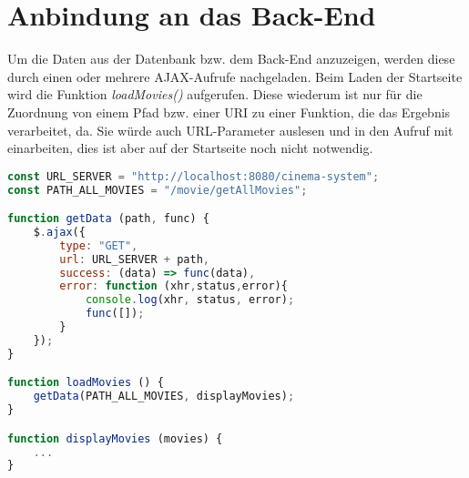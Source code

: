 \section{Anbindung an das Back-End}
\label{sec:anbindung_backend}

Um die Daten aus der Datenbank bzw. dem Back-End anzuzeigen, werden diese durch einen oder mehrere \acs{AJAX}-Aufrufe nachgeladen.
Beim Laden der Startseite wird die Funktion \textit{loadMovies()} aufgerufen.
Diese wiederum ist nur für die Zuordnung von einem Pfad bzw. einer \acs{URI} zu einer Funktion, die das Ergebnis verarbeitet, da.
Sie würde auch \acs{URL}-Parameter auslesen und in den Aufruf mit einarbeiten, dies ist aber auf der Startseite noch nicht notwendig.

\begin{lstlisting}[language=JavaScript]
const URL_SERVER = "http://localhost:8080/cinema-system";
const PATH_ALL_MOVIES = "/movie/getAllMovies";

function getData (path, func) {
	$.ajax({
		type: "GET",
		url: URL_SERVER + path,
		success: (data) => func(data),
		error: function (xhr,status,error){
			console.log(xhr, status, error);
			func([]);
		}
	});
}

function loadMovies () {
	getData(PATH_ALL_MOVIES, displayMovies);
}

function displayMovies (movies) {
	...
}
\end{lstlisting}
\label{lst:ajax_all_movies}